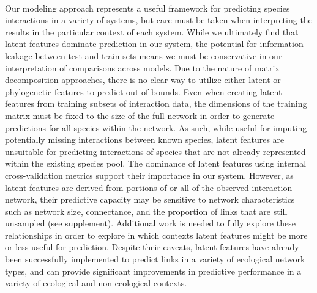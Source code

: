 \paragraph*{} Our modeling approach represents a useful framework for predicting species interactions in a variety of systems, but care must be taken when interpreting the results in the particular context of each system. While we ultimately find that latent features dominate prediction in our system, the potential for information leakage between test and train sets means we must be conservative in our interpretation of comparisons across models. Due to the nature of matrix decomposition approaches, there is no clear way to utilize either latent or phylogenetic features to predict out of bounds. Even when creating latent features from training subsets of interaction data, the dimensions of the training matrix must be fixed to the size of the full network in order to generate predictions for all species within the network. As such, while useful for imputing potentially missing interactions between known species, latent features are unsuitable for predicting interactions of species that are not already represented within the existing species pool. The dominance of latent features using internal cross-validation metrics support their importance in our system. However, as latent features are derived from portions of or all of the observed interaction network, their predictive capacity may be sensitive to network characteristics such as network size, connectance, and the proportion of links that are still unsampled (see supplement).  Additional work is needed to fully explore these relationships in order to explore in which contexts latent features might be more or less useful for prediction. Despite their caveats, latent features have already been successfully implemented to predict links in a variety of ecological network types, and can provide significant improvements in predictive performance in a variety of ecological \parencite{poisot2021imputing, banville2023constrains, poisot2023network, nunes2024estimated} and non-ecological \parencite{yeung2002reverse, wu2019prediction, zeng2020sdlda} contexts.

